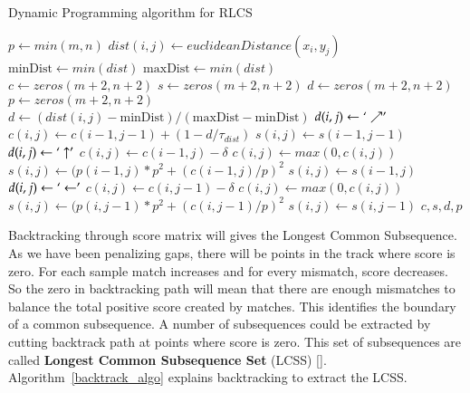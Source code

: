 \documentclass[MTech]{iitmdiss}
\begin{document}
\begin{algorithm}
\caption{Dynamic Programming algorithm for RLCS}
\label{rlcs_algo}
\begin{algorithmic}[1]
    \State $p \gets min(m, n)$
        \State $dist(i, j) \gets euclideanDistance(x_i, y_j)$
      \EndFor
    \EndFor
    \State $\text{minDist} \gets min(dist)$ 
    \State $\text{maxDist} \gets min(dist)$ \\

    \State $c\gets zeros(m+2, n+2)$ 
    \State $s \gets zeros(m+2, n+2)$ 
    \State $d \gets zeros(m+2, n+2)$ 
    \State $p \gets zeros(m+2, n+2)$ \\

      \State $d \gets (dist(i, j) - \text{minDist})/(\text{maxDist} - \text{minDist})$ 
        \State $d (i, j) \gets ` \nearrow '$
        \State $c (i, j) \gets c (i-1, j-1) + (1 - d/\tau_{dist})$
        \State $s (i, j) \gets s (i-1, j-1)$
        \State $d (i, j) \gets ` \uparrow'$
        \State $c (i, j) \gets c (i-1, j) - \delta$
        \State $c (i, j) \gets max(0, c (i, j))$
            \State $s(i, j) \gets (p (i-1, j)*p^2 + (c (i-1, j)/p)^2$
        \Else
            \State $s (i, j) \gets s (i-1, j)$
        \EndIf
      \Else
        \State $d (i, j) \gets ` \leftarrow'$
        \State $c (i, j) \gets c (i, j - 1) - \delta$
        \State $c (i, j) \gets max(0, c (i, j))$
            \State $s(i, j) \gets (p (i, j - 1)*p^2 + (c (i, j - 1)/p)^2$
        \Else
            \State $s (i, j) \gets s (i, j - 1)$
        \EndIf        
      \EndIf
    \EndFor
  \EndFor
  \State \Return $c, s, d, p$
  \EndFunction
\end{algorithmic}
\end{algorithm}

Backtracking through score matrix will gives the Longest Common Subsequence. As we have been penalizing gaps, there will be points in the track where score is zero. For each sample match increases and for every mismatch, score decreases. So the zero in backtracking path will mean that there are enough mismatches to balance the total positive score created by matches. This identifies the boundary of a common subsequence. A number of subsequences could be extracted by cutting backtrack path at points where score is zero. This set of subsequences are called \textbf{Longest Common Subsequence Set} (LCSS) [\cite{duttaraga}]. Algorithm~\ref{backtrack_algo} explains backtracking to extract the LCSS.
\end{document}
